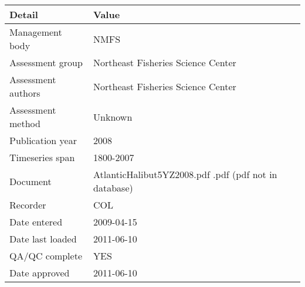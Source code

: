 \begin{table}[htb]
\centering
\begin{tabular}{lp{7cm}}
\toprule
Detail & Value \\
\midrule
Management body    & NMFS                                                  \\
Assessment group   & Northeast Fisheries Science Center                    \\
Assessment authors & Northeast Fisheries Science Center                    \\
Assessment method  & Unknown                                               \\
Publication year   & 2008                                                  \\
Timeseries span    & 1800-2007                                             \\
Document           & AtlanticHalibut5YZ2008.pdf .pdf (pdf not in database) \\
Recorder           & COL                                                   \\
Date entered       & 2009-04-15                                            \\
Date last loaded   & 2011-06-10                                            \\
QA/QC complete     & YES                                                   \\
Date approved      & 2011-06-10                                            \\
\bottomrule
\end{tabular}
\label{tab:assessdet}
\end{table}
